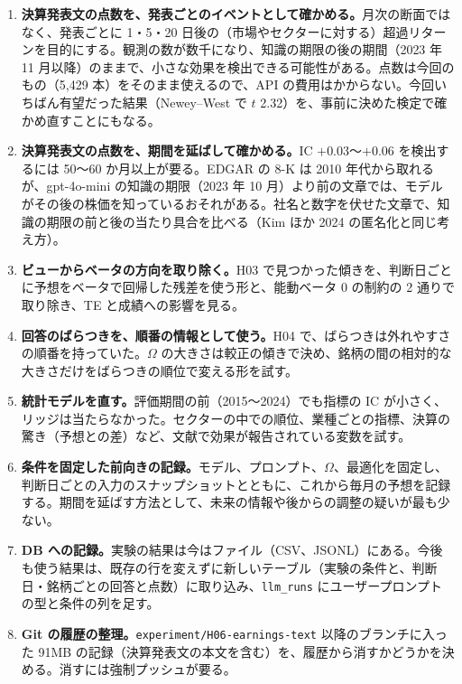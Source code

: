 \documentclass[xelatex,ja=standard,jafont=haranoaji,a4paper,10pt,openany]{bxjsreport}
\newcommand{\code}[1]{\texttt{#1}}
\begin{document}
\begin{enumerate}
\item \textbf{決算発表文の点数を、発表ごとのイベントとして確かめる。}月次の断面ではなく、発表ごとに 1・5・20 日後の（市場やセクターに対する）超過リターンを目的にする。観測の数が数千になり、知識の期限の後の期間（2023 年 11 月以降）のままで、小さな効果を検出できる可能性がある。点数は今回のもの（5,429 本）をそのまま使えるので、API の費用はかからない。今回いちばん有望だった結果（Newey--West で $t$ 2.32）を、事前に決めた検定で確かめ直すことにもなる。
\item \textbf{決算発表文の点数を、期間を延ばして確かめる。}IC $+0.03$〜$+0.06$ を検出するには 50〜60 か月以上が要る。EDGAR の 8-K は 2010 年代から取れるが、gpt-4o-mini の知識の期限（2023 年 10 月）より前の文章では、モデルがその後の株価を知っているおそれがある。社名と数字を伏せた文章で、知識の期限の前と後の当たり具合を比べる（Kim ほか 2024 の匿名化と同じ考え方）。
\item \textbf{ビューからベータの方向を取り除く。}H03 で見つかった傾きを、判断日ごとに予想をベータで回帰した残差を使う形と、能動ベータ 0 の制約の 2 通りで取り除き、TE と成績への影響を見る。
\item \textbf{回答のばらつきを、順番の情報として使う。}H04 で、ばらつきは外れやすさの順番を持っていた。$\Omega$ の大きさは較正の傾きで決め、銘柄の間の相対的な大きさだけをばらつきの順位で変える形を試す。
\item \textbf{統計モデルを直す。}評価期間の前（2015〜2024）でも指標の IC が小さく、リッジは当たらなかった。セクターの中での順位、業種ごとの指標、決算の驚き（予想との差）など、文献で効果が報告されている変数を試す。
\item \textbf{条件を固定した前向きの記録。}モデル、プロンプト、$\Omega$、最適化を固定し、判断日ごとの入力のスナップショットとともに、これから毎月の予想を記録する。期間を延ばす方法として、未来の情報や後からの調整の疑いが最も少ない。
\item \textbf{DB への記録。}実験の結果は今はファイル（CSV、JSONL）にある。今後も使う結果は、既存の行を変えずに新しいテーブル（実験の条件と、判断日・銘柄ごとの回答と点数）に取り込み、\code{llm\_runs} にユーザープロンプトの型と条件の列を足す。
\item \textbf{Git の履歴の整理。}\code{experiment/H06-earnings-text} 以降のブランチに入った 91MB の記録（決算発表文の本文を含む）を、履歴から消すかどうかを決める。消すには強制プッシュが要る。
\end{enumerate}

\end{document}
